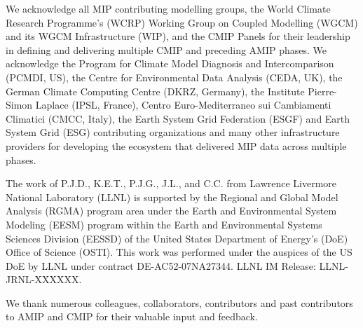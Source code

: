 \documentclass[gmd, preprint]{copernicus}
\begin{document}
\appendixtables   %







\begin{acknowledgements}

We acknowledge all MIP contributing modelling groups, the World Climate Research Programme's (WCRP) Working Group on Coupled Modelling (WGCM) and its WGCM Infrastructure (WIP), and the CMIP Panels for their leadership in defining and delivering multiple CMIP and preceding AMIP phases. We acknowledge the Program for Climate Model Diagnosis and Intercomparison (PCMDI, US), the Centre for Environmental Data Analysis (CEDA, UK), the German Climate Computing Centre (DKRZ, Germany), the Institute Pierre-Simon Laplace (IPSL, France), Centro Euro-Mediterraneo sui Cambiamenti Climatici (CMCC, Italy), the Earth System Grid Federation (ESGF) and Earth System Grid (ESG) contributing organizations and many other infrastructure providers for developing the ecosystem that delivered MIP data across multiple phases.

The work of P.J.D., K.E.T., P.J.G., J.L., and C.C. from Lawrence Livermore National Laboratory (LLNL) is supported by the Regional and Global Model Analysis (RGMA) program area under the Earth and Environmental System Modeling (EESM) program within the Earth and Environmental Systems Sciences Division (EESSD) of the United States Department of Energy’s (DoE) Office of Science (OSTI). This work was performed under the auspices of the US DoE by LLNL under contract DE-AC52-07NA27344. LLNL IM Release: LLNL-JRNL-XXXXXX.

We thank numerous colleagues, collaborators, contributors and past contributors to AMIP and CMIP for their valuable input and feedback.

\end{acknowledgements}
\end{document}
